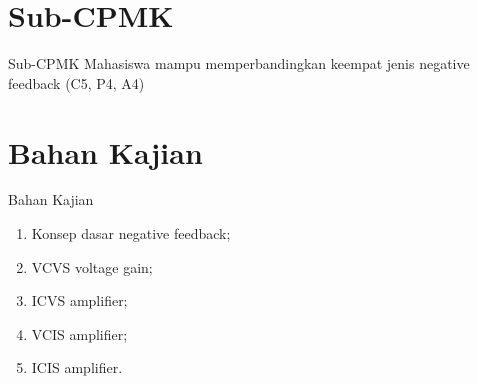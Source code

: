 \section{Sub-CPMK}
\begin{frame}{Sub-CPMK}
	Mahasiswa mampu memperbandingkan keempat jenis negative feedback (C5, P4, A4)
\end{frame}

\section{Bahan Kajian}
\begin{frame}{Bahan Kajian}
	\begin{enumerate}
		\item Konsep dasar negative feedback;
		\item VCVS voltage gain;
		\item ICVS amplifier;
		\item VCIS amplifier;
		\item ICIS amplifier.
	\end{enumerate}
\end{frame}